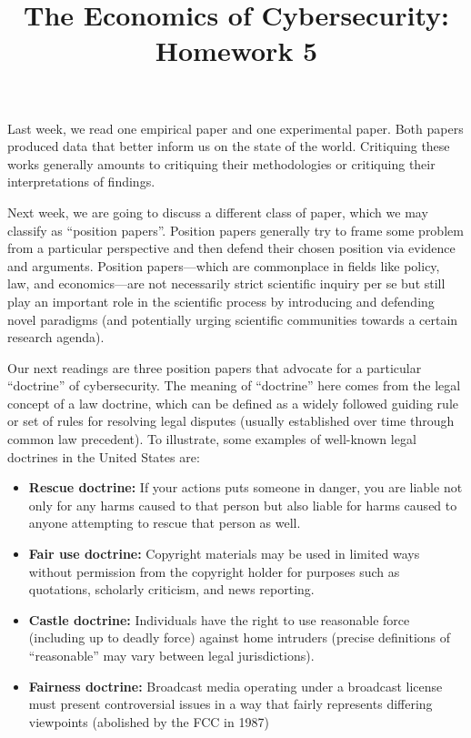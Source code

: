 \documentclass[11pt]{article}
\title{The Economics of Cybersecurity: Homework 5}
\author{}
\begin{document}
\maketitle


\section*{}

Last week, we read one empirical paper and one experimental paper. Both papers produced data that better inform us on the state of the world. Critiquing these works generally amounts to critiquing their methodologies or critiquing their interpretations of findings. 

Next week, we are going to discuss a different class of paper, which we may classify as ``position papers''.
Position papers generally try to frame some problem from a particular perspective and then defend their chosen position via evidence and arguments. 
Position papers---which are commonplace in fields like policy, law, and economics---are not necessarily strict scientific inquiry per se but still play an important role in the scientific process by introducing and defending novel paradigms (and potentially urging scientific communities towards a certain research agenda). 

Our next readings are three position papers that advocate for a particular ``doctrine'' of cybersecurity. The meaning of ``doctrine'' here comes from the legal concept of a law doctrine, which can be defined as a widely followed guiding rule or set of rules for resolving legal disputes (usually established over time through common law precedent).
To illustrate, some examples of well-known legal doctrines in the United States are:
\begin{itemize}
    \item {\bf Rescue doctrine:} If your actions puts someone in danger, you are liable not only for any harms caused to that person but also liable for harms caused to anyone attempting to rescue that person as well. 
    \item {\bf Fair use doctrine:} Copyright materials may be used in limited ways without permission from the copyright holder for purposes such as quotations, scholarly criticism, and news reporting. 
    \item {\bf Castle doctrine:} Individuals have the right to use reasonable force (including up to deadly force) against home intruders (precise definitions of ``reasonable'' may vary between legal jurisdictions).
    \item {\bf Fairness doctrine:} Broadcast media operating under a broadcast license must present controversial issues in a way that fairly represents differing viewpoints (abolished by the FCC in 1987)
\end{itemize}
\end{document}

